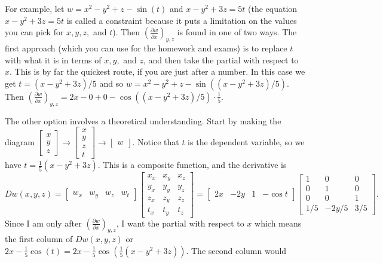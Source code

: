 For example, let $w=x^2-y^2+z-\sin(t)$ and $x-y^2+3z=5t$ (the equation
$x-y^2+3z=5t$ is called a constraint because it puts a limitation on
the values you can pick for $x,y,z,$ and $t$).  Then
$\displaystyle\left(\frac{\partial w}{\partial x}\right)_{y,z}$ is found in one of
two ways.  The first approach (which you can use for the homework and
exams) is to replace $t$ with what it is in terms of $x,y,$ and $z$,
and then take the partial with respect to $x$.  This is by far the
quickest route, if you are just after a number.  In this case we get
$t=(x-y^2+3z)/5$ and so $w = x^2-y^2+z-\sin((x-y^2+3z)/5)$.  Then
$\displaystyle\left(\frac{\partial w}{\partial x}\right)_{y,z} =
2x-0+0-\cos((x-y^2+3z)/5)\cdot \frac{1}{5}$.

The other option involves a theoretical understanding.  Start by
making the diagram $\begin{bmatrix}x\\y\\z\end{bmatrix}\to
\begin{bmatrix}x\\y\\z\\t\end{bmatrix}\to
\begin{bmatrix}w\end{bmatrix}$. Notice that $t$ is the dependent
variable, so we have $t=\frac{1}{5}(x-y^2+3z)$. This is a composite
function, and the derivative is
$$Dw(x,y,z)=\begin{bmatrix}w_x&w_y&w_z&w_t\end{bmatrix}\begin{bmatrix}x_x&x_y&x_z\\y_x&y_y&y_z\\z_x&z_y&z_z\\t_x&t_y&t_z\end{bmatrix}
= \begin{bmatrix}2x&-2y&1&-\cos
t\end{bmatrix}\begin{bmatrix}1&0&0\\0&1&0\\0&0&1\\1/5&-2y/5&3/5\end{bmatrix}.$$
Since I am only after $\displaystyle\left(\frac{\partial w}{\partial
x}\right)_{y,z}$, I want the partial with respect to $x$ which means
the first column of $Dw(x,y,z)$ or $2x-\frac{1}{5}\cos(t) =
2x-\frac{1}{5}\cos(\frac{1}{5}(x-y^2+3z))$.  The second column would
